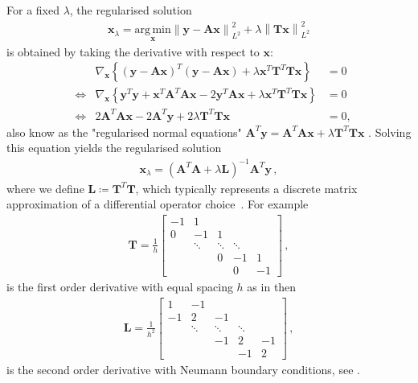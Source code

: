 For a fixed $\lambda$, the regularised solution
\begin{align}
	\bm{x}_{\lambda} = \underset{\bm{x}}{\mathrm{arg\,min}} \left\lVert \bm{y} - \bm{A} \bm{x} \right\rVert_{L^2}^2 + \lambda \left\lVert \bm{T} \bm{x} \right\rVert_{L^2}^2
\end{align}
is obtained by taking the derivative with respect to $\bm{x}$:
\begin{align}
	& & \nabla_{\bm{x}} \left\{ (\bm{y} - \bm{A} \bm{x})^T (\bm{y} - \bm{A} \bm{x}) + \lambda \bm{x}^T \bm{T}^T \bm{T} \bm{x} \right\} &= 0 \\
	&\iff & \nabla_{\bm{x}} \left\{ \bm{y}^T \bm{y} + \bm{x}^T \bm{A}^T \bm{A} \bm{x} - 2 \bm{y}^T \bm{A} \bm{x} + \lambda \bm{x}^T \bm{T}^T \bm{T} \bm{x} \right\} &= 0 \\
	&\iff & 2 \bm{A}^T \bm{A} \bm{x} - 2 \bm{A}^T \bm{y} + 2 \lambda \bm{T}^T \bm{T} \bm{x} &= 0,
\end{align}
also know as the "regularised normal equations" $\bm{A}^T \bm{y} = \bm{A}^T \bm{A} \bm{x} + \lambda \bm{T}^T \bm{T} \bm{x}$ \cite{Hansen2001LCurve}.
Solving this equation yields the regularised solution
\begin{align}
	\bm{x}_{\lambda} = (\bm{A}^T \bm{A} + \lambda \bm{L})^{-1} \bm{A}^T \bm{y} \, , \label{eq:regSol}
\end{align}
where we define $\bm{L} \coloneqq \bm{T}^T \bm{T}$, which typically represents a discrete matrix approximation of a differential operator choice~\cite{tan2016LecNot}.
For example
\begin{align}
	\bm{T} = \frac{1}{h}
	\begin{bmatrix}
		-1 & 1 & & &  \\
		0 & -1 & 1 & &   \\
		& \ddots & \ddots & \ddots &\\ 
		& & 0 & -1 & 1  \\
		& & & 0 & -1 
	\end{bmatrix} \, ,
\end{align}
is the first order derivative with equal spacing $h$ as in \cite{tan2016LecNot} then
\begin{align}
	\bm{L} = \frac{1}{h^2}
	\begin{bmatrix}
		1 & -1 & & &  \\
		-1 & 2& -1 & &   \\
		& \ddots & \ddots & \ddots &\\ 
		& & -1 & 2 & -1  \\
		& & & -1 & 2 
	\end{bmatrix} \, ,
\end{align}
is the second order derivative with Neumann boundary conditions, see \cite{wang2015graphs}.

